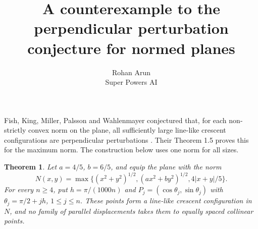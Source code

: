 \documentclass[11pt]{article}
\title{A counterexample to the perpendicular perturbation conjecture for normed planes}
\author{Rohan Arun\\Super Powers AI}\date{}
\newtheorem{theorem}{Theorem}
\begin{document}
\maketitle
Fish, King, Miller, Palsson and Wahlenmayer conjectured that, for each
non-strictly convex norm on the plane, all sufficiently large line-like
crescent configurations are perpendicular perturbations
\cite[Conjecture 6.5]{fish}. Their Theorem 1.5 proves this for the maximum norm.
The construction below uses one norm for all sizes.
\begin{theorem}
Let $a=4/5$, $b=6/5$, and equip the plane with the norm
\[
 N(x,y)=\max\{(x^2+y^2)^{1/2},(ax^2+by^2)^{1/2},4|x+y|/5\}.
\]
For every $n\ge4$, put $h=\pi/(1000n)$ and
$P_j=(\cos\theta_j,\sin\theta_j)$ with
$\theta_j=\pi/2+jh$, $1\le j\le n$.
These points form a line-like crescent configuration in $N$, and no family
of parallel displacements takes them to equally spaced collinear points.
\end{theorem}
\end{document}
